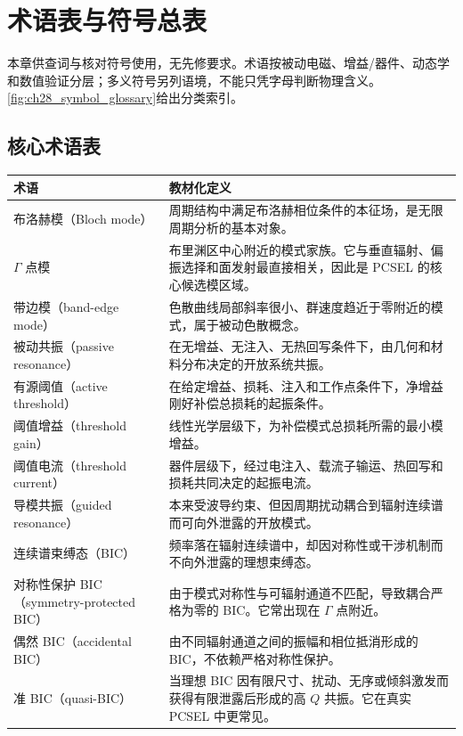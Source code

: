 ﻿%
\chapter{术语表与符号总表}
\label{ch:glossary}

本章供查词与核对符号使用，无先修要求。术语按被动电磁、增益/器件、动态学和数值验证分层；多义符号另列语境，不能只凭字母判断物理含义。\cref{fig:ch28_symbol_glossary}给出分类索引。


\section{核心术语表}
\begin{longtable}{@{}p{}p{}@{}}
\toprule
术语 & 教材化定义 \\
\midrule
\endhead
布洛赫模（Bloch mode） & 周期结构中满足布洛赫相位条件的本征场，是无限周期分析的基本对象。 \\
$\Gamma$ 点模 & 布里渊区中心附近的模式家族。它与垂直辐射、偏振选择和面发射最直接相关，因此是 PCSEL 的核心候选模区域。 \\
带边模（band-edge mode） & 色散曲线局部斜率很小、群速度趋近于零附近的模式，属于被动色散概念。 \\
被动共振（passive resonance） & 在无增益、无注入、无热回写条件下，由几何和材料分布决定的开放系统共振。 \\
有源阈值（active threshold） & 在给定增益、损耗、注入和工作点条件下，净增益刚好补偿总损耗的起振条件。 \\
阈值增益（threshold gain） & 线性光学层级下，为补偿模式总损耗所需的最小模增益。 \\
阈值电流（threshold current） & 器件层级下，经过电注入、载流子输运、热回写和损耗共同决定的起振电流。 \\
导模共振（guided resonance） & 本来受波导约束、但因周期扰动耦合到辐射连续谱而可向外泄露的开放模式。 \\
连续谱束缚态（BIC） & 频率落在辐射连续谱中，却因对称性或干涉机制而不向外泄露的理想束缚态。 \\
对称性保护 BIC（symmetry-protected BIC） & 由于模式对称性与可辐射通道不匹配，导致耦合严格为零的 BIC。它常出现在 $\Gamma$ 点附近。 \\
偶然 BIC（accidental BIC） & 由不同辐射通道之间的振幅和相位抵消形成的 BIC，不依赖严格对称性保护。 \\
准 BIC（quasi-BIC） & 当理想 BIC 因有限尺寸、扰动、无序或倾斜激发而获得有限泄露后形成的高 $Q$ 共振。它在真实 PCSEL 中更常见。 \\

\end{longtable}
